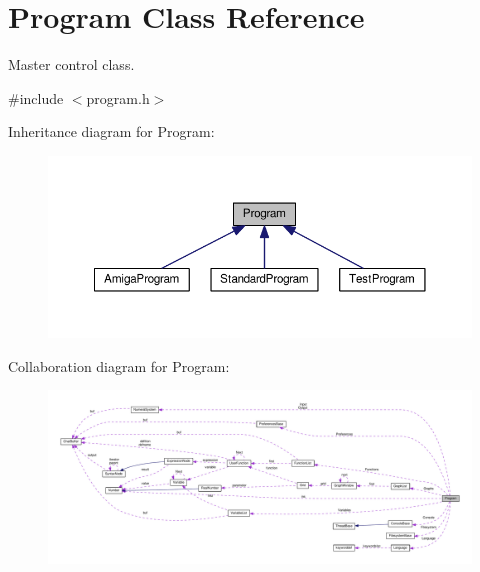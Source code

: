 \hypertarget{classProgram}{}\section{Program Class Reference}
\label{classProgram}


Master control class.  




{\ttfamily \#include $<$program.\+h$>$}



Inheritance diagram for Program\+:\nopagebreak
\begin{figure}[H]
\begin{center}
\leavevmode
\includegraphics[width=350pt]{classProgram__inherit__graph}
\end{center}
\end{figure}


Collaboration diagram for Program\+:\nopagebreak
\begin{figure}[H]
\begin{center}
\leavevmode
\includegraphics[width=350pt]{classProgram__coll__graph}
\end{center}
\end{figure}
